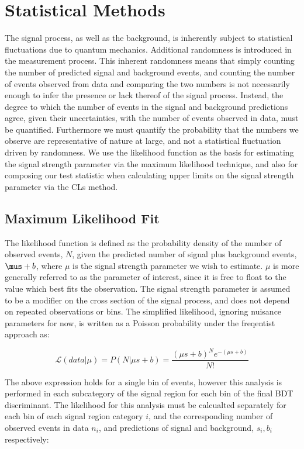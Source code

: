 %
%

\chapter{Statistical Methods}
The \tth signal process, as well as the background, is inherently subject to statistical fluctuations due to quantum mechanics.
Additional randomness is introduced in the measurement process. This inherent randomness means that simply counting the number of predicted
signal and background events, and counting the number of events observed from data and comparing the two numbers is not necessarily enough to infer the presence or
lack thereof of the \tth signal process. Instead, the degree to which the
number of events in the signal and background predictions agree, given their uncertainties, with the number of events observed in data, must be quantified.
Furthermore we must quantify the probability that the numbers we observe are representative of nature at large, and not a statistical fluctuation driven by randomness. 
We use the likelihood function as the basis for estimating the signal strength parameter via the maximum likelihood technique, and also for composing our test statistic when
calculating upper limits  on the signal strength parameter via the CLs method. 


\section{Maximum Likelihood Fit}
The likelihood function is defined as the probability density of the number of observed events, $N$, given the predicted number of signal plus background events, $\mus + b$,
where $\mu$ is the signal strength parameter we wish to estimate. $\mu$ is more generally referred to as the parameter of interest, since it is free to float to the value
which best fits the observation. The signal strength parameter is assumed to be a modifier on the cross section of the \tth signal process, and does not depend on repeated
observations or bins. The simplified likelihood, ignoring nuisance parameters for now, is written as a Poisson probability under the freqentist approach as:

\begin{equation}
\label{eqn:likelihood1}
\mathcal{L}(data|\mu) = P(N|\mu s+b) = \frac{(\mu s+b)^{N}e^{-(\mu s+b)}}{N!}
\end{equation}

\noindent The above expression holds for a single bin of events, however this analysis is performed in each subcategory of the signal
region for each bin of the final BDT discriminant. The likelihood for this analysis must be calcualted separately for each bin of each signal region category $i$, and
the corresponding number of observed events in data $n_{i}$, and predictions of signal and background, $s_{i}, b_{i}$ respectively:

